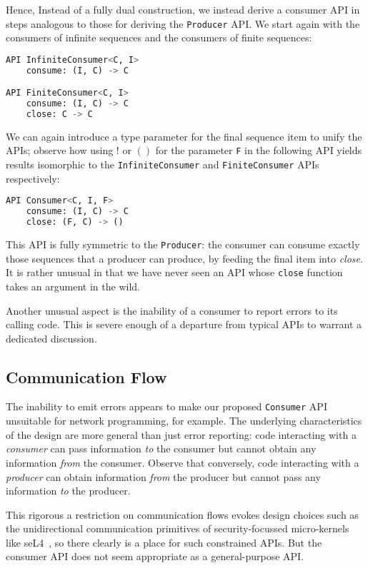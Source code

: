 \documentclass[sigplan,screen,10pt,review]{acmart}
\begin{document}
Hence, Instead of a fully dual construction, we instead derive a consumer API in steps analogous to those for deriving the \texttt{Producer} API. We start again with the consumers of infinite sequences and the consumers of finite sequences:

\begin{lstlisting}[language=Python]
API InfiniteConsumer<C, I>
    consume: (I, C) -> C

API FiniteConsumer<C, I>
    consume: (I, C) -> C
    close: C -> C
\end{lstlisting}

We can again introduce a type parameter for the final sequence item to unify the APIs; observe how using $!$ or $()$ for the parameter \texttt{F} in the following API yields results isomorphic to the \texttt{InfiniteConsumer} and \texttt{FiniteConsumer} APIs respectively:

\begin{lstlisting}[language=Python]
API Consumer<C, I, F>
    consume: (I, C) -> C
    close: (F, C) -> ()
\end{lstlisting}

This API is fully symmetric to the \texttt{Producer}: the consumer can consume exactly those sequences that a producer can produce, by feeding the final item into \textit{close}. It is rather unusual in that we have never seen an API whose \texttt{close} function takes an argument in the wild.

Another unusual aspect is the inability of a consumer to report errors to its calling code. This is severe enough of a departure from typical APIs to warrant a dedicated discussion.

\subsection{Communication Flow}\label{communication_flow}

The inability to emit errors appears to make our proposed \texttt{Consumer} API unsuitable for network programming, for example. The underlying characteristics of the design are more general than just error reporting: code interacting with a \textit{consumer} can pass information \textit{to} the consumer but cannot obtain any information \textit{from} the consumer. Observe that conversely, code interacting with a \textit{producer} can obtain information \textit{from} the producer but cannot pass any information \textit{to} the producer.

This rigorous a restriction on communication flows evokes design choices such as the unidirectional communication primitives of security-focussed micro-kernels like seL4~\cite{murray2013sel4}, so there clearly is a place for such constrained APIs. But the consumer API does not seem appropriate as a general-purpose API.
\end{document}
